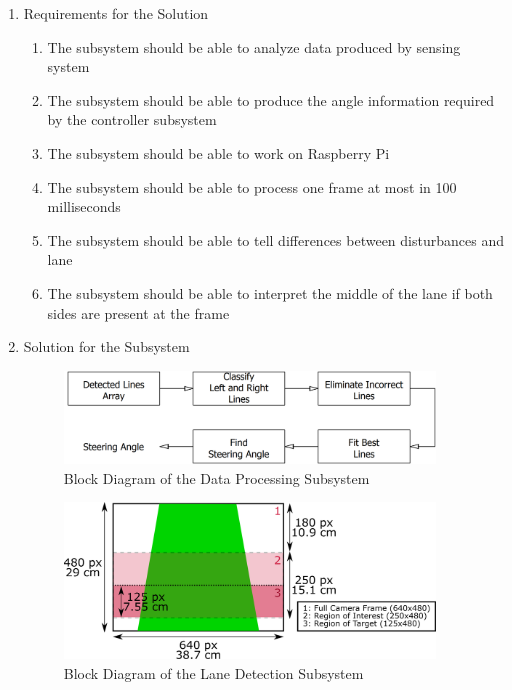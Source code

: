\documentclass[a4paper,12pt]{article}
\begin{document}
		\begin{enumerate}
			\item {Requirements for the Solution}
			
				\begin{enumerate}
					\item The subsystem should be able to analyze data produced by sensing system
					\item The subsystem should be able to produce the angle information required by the controller subsystem
					\item The subsystem should be able to work on Raspberry Pi
					\item The subsystem should be able to process one frame at most in 100 milliseconds
					\item The subsystem should be able to tell differences between disturbances and lane
					\item The subsystem should be able to interpret the middle of the lane if both sides are present at the frame
				\end{enumerate}
				
			\item {Solution for the Subsystem}
			\begin{figure}[h]
				\includegraphics[width=0.93\textwidth,center]{images/vModels/dataProcessing_subsystem}
				\caption{Block Diagram of the Data Processing Subsystem}\label{fig:dataProcessing_subsystem}
			\end{figure}
			\begin{figure}[h]
				\centering
				\includegraphics[width=0.93\textwidth]{images/camera_vision_explained}
				\caption{Block Diagram of the Lane Detection Subsystem}\label{fig:camera_vision_explained}
			\end{figure}
		

\end{enumerate}
\end{document}

